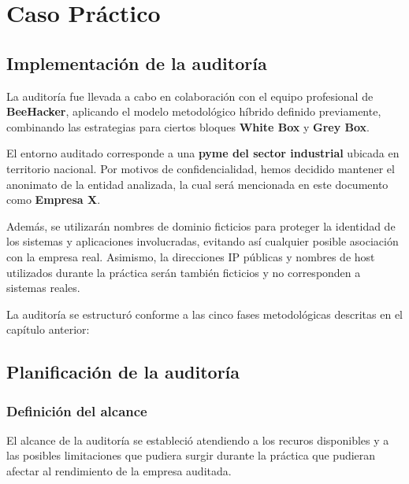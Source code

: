 \documentclass[a4paper, 10pt]{article}
\begin{document}
\section{Caso Práctico}

\subsection{Implementación de la auditoría}

La auditoría fue llevada a cabo en colaboración con el equipo profesional de \textbf{BeeHacker}, aplicando el modelo metodológico híbrido definido previamente, 
combinando las estrategias para ciertos bloques \textbf{White Box} y \textbf{Grey Box}. 

\par\vspace{0.4cm}

El entorno auditado corresponde a una \textbf{pyme del sector industrial} ubicada en territorio nacional. Por motivos de confidencialidad, hemos decidido mantener el anonimato de la entidad analizada, la cual será mencionada en este documento como \textbf{Empresa X}. 
\par\vspace{0.4cm}

Además, se utilizarán nombres de dominio ficticios para proteger la identidad de los sistemas y aplicaciones involucradas, evitando así cualquier posible asociación con la empresa real. Asimismo, la direcciones IP públicas y nombres de host utilizados durante la práctica serán también ficticios y no corresponden a sistemas reales.

\par\vspace{0.4cm}

La auditoría se estructuró conforme a las cinco fases metodológicas descritas en el capítulo anterior:


\subsection{Planificación de la auditoría}
\par\vspace{0.4cm}
\subsubsection*{Definición del alcance}

El alcance de la auditoría se estableció atendiendo a los recuros disponibles y a las posibles limitaciones que pudiera surgir durante la práctica que pudieran afectar al rendimiento de la empresa auditada.
\end{document}
